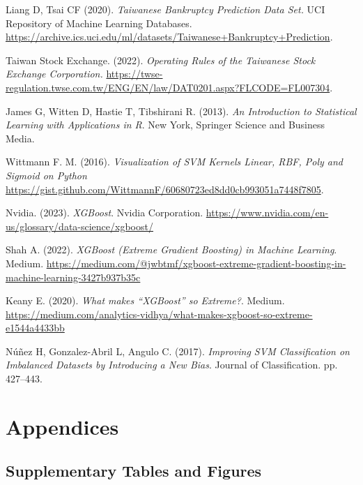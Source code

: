 \documentclass[12pt]{report}
\begin{document}
\begin{thebibliography}{9}

Liang D, Tsai CF (2020). \textit{Taiwanese Bankruptcy Prediction Data Set.}
UCI Repository of Machine Learning Databases. \url{https://archive.ics.uci.edu/ml/datasets/Taiwanese+Bankruptcy+Prediction}.

Taiwan Stock Exchange. (2022). \textit{Operating Rules of the Taiwanese Stock Exchange Corporation.}
\url{https://twse-regulation.twse.com.tw/ENG/EN/law/DAT0201.aspx?FLCODE=FL007304}.

James G, Witten D, Hastie T, Tibshirani R. (2013). \textit{An Introduction to Statistical Learning with Applications in R}. New York, Springer Science and Business Media.

Wittmann F. M. (2016). \textit{Visualization of SVM Kernels Linear, RBF, Poly and Sigmoid on Python} \url{https://gist.github.com/WittmannF/60680723ed8dd0cb993051a7448f7805}.

Nvidia. (2023). \textit{XGBoost}. Nvidia Corporation. \url{https://www.nvidia.com/en-us/glossary/data-science/xgboost/}

Shah A. (2022). \textit{XGBoost (Extreme Gradient Boosting) in Machine Learning}. Medium. \url{https://medium.com/@jwbtmf/xgboost-extreme-gradient-boosting-in-machine-learning-3427b937b35c} 

Keany E. (2020). \textit{What makes “XGBoost” so Extreme?}. Medium. \url{https://medium.com/analytics-vidhya/what-makes-xgboost-so-extreme-e1544a4433bb} 

Núñez H, Gonzalez-Abril L, Angulo C. (2017). \textit{Improving SVM Classification on Imbalanced Datasets by Introducing a New Bias}. Journal of Classification. pp. 427–443.


\end{thebibliography}

\chapter{Appendices}
\section{Supplementary Tables and Figures}
\end{document}
